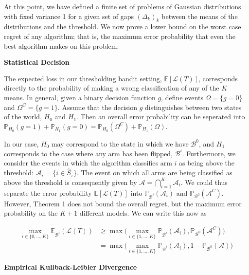 \documentclass[11pt,]{article}
\begin{document}
At this point, we have defined a finite set of problems of Gaussian
distributions with fixed variance 1 for a given set of gaps
\((\Delta_k)_k\) between the means of the distributions and the
threshold. We now prove a lower bound on the worst case regret of any
algorithm; that is, the maximum error probability that even the best
algorithm makes on this problem.

\newpage

\textbf{Statistical Decision}

The expected loss in our thresholding bandit setting,
\(\mathbb{E}[\mathcal{L}(T)]\), corresponds directly to the probability
of making a wrong classification of any of the \(K\) means. In general,
given a binary decision function \(g\), define events
\(\Omega = \{g = 0\}\) and \(\Omega^C = \{g = 1\}\). Assume that the
decision \(g\) distinguishes between two states of the world, \(H_0\)
and \(H_1\). Then an overall error probability can be seperated into
\(\mathbb{P}_{H_0}(g=1) + \mathbb{P}_{H_1}(g = 0) = \mathbb{P}_{H_0}(\Omega^C) + \mathbb{P}_{H_1}(\Omega)\).

In our case, \(H_0\) may correspond to the state in which we have
\(\mathcal{B}^0\), and \(H_1\) corresponds to the case where any arm has
been flipped, \(\mathcal{B}^i\). Furthermore, we consider the events in
which the algorithm classifies arm \(i\) as being above the threshold:
\(\mathcal{A}_i = \{i \in \hat{S}_\tau\}\). The event on which all arms
are being classified as above the threshold is consequently given by
\(\mathcal{A} = \bigcap_{i=1}^K \mathcal{A}_i\). We could thus separate
the error probability \(\mathbb{E}[\mathcal{L}(T)]\) into
\(\mathbb{P}_{\mathcal{B}^i}(\mathcal{A}_i)\) and
\(\mathbb{P}_{\mathcal{B}^0}(\mathcal{A}^C)\). However, Theorem 1 does
not bound the overall regret, but the maximum error probability on the
\(K+1\) different models. We can write this now as

\begin{align}
\max_{i \in \{0, \dots, K\}} \mathbb{E}_{\mathcal{B}^i} (\mathcal{L}(T)) & \geq \max \Big( \max_{i \in \{1, \dots, K\}} \mathbb{P}_{\mathcal{B}^i}(\mathcal{A}_i), \mathbb{P}_{\mathcal{B}^0}(\mathcal{A}^C) \Big) \\
& = \max \Big( \max_{i \in \{1, \dots, K\}} \mathbb{P}_{\mathcal{B}^i}(\mathcal{A}_i), 1 - \mathbb{P}_{\mathcal{B}^0}(\mathcal{A}) \Big) \label{LocatelliTheorem1ExpRegret}
\end{align}

\textbf{Empirical Kullback-Leibler Divergence}
\end{document}
